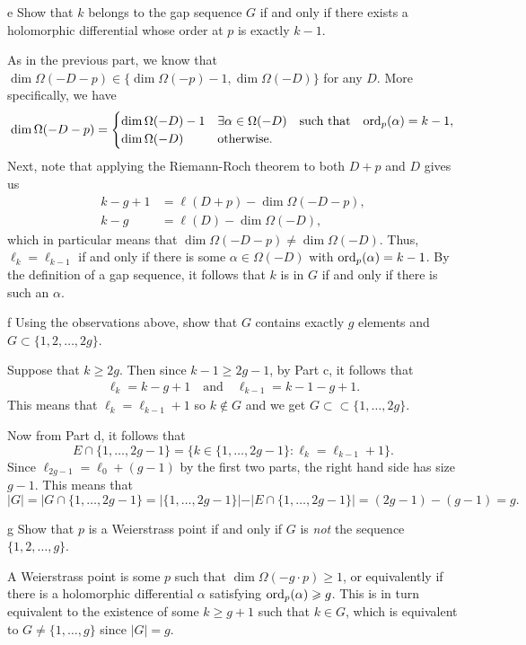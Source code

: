 \documentclass[expanded]{lkx_pset}
\begin{document}
\begin{solution}
	\begin{part}{e}
		Show that $k$ belongs to the gap sequence $G$ if and only if there
		exists a holomorphic differential whose order at $p$ is exactly $k-1$.
	\end{part}

	As in the previous part, we know that $\dim \Omega(-D-p) \in \{ \dim \Omega(-p)-1, \dim \Omega(-D)\}$ for any $D$. More specifically, we have
	\[
		\dim \Omega(-D -p) = \begin{cases}
			\dim \Omega(-D) - 1 & \exists \alpha\in \Omega(-D)\quad\textrm{such that}\quad \mathrm{ord}_p(\alpha)=k-1, \\
			\dim\Omega(-D)      & \textrm{otherwise}.
		\end{cases}
	\]
	Next, note that applying the Riemann-Roch theorem to both $D+p$ and $D$ gives us
	\[
		\begin{aligned}
			k-g+1 & = \ell(D+p) - \dim \Omega(-D - p), \\
			k-g   & = \ell(D) - \dim \Omega(-D),
		\end{aligned}
	\]
	which in particular means that $\dim \Omega(-D-p) \neq \dim\Omega(-D)$. Thus, $\ell_k=\ell_{k-1}$ if and only if there is some $\alpha \in \Omega(-D)$ with $\mathrm{ord}_p(\alpha)=k-1$. By the definition of a gap sequence, it follows that $k$ is in $G$ if and only if there is such an $\alpha$.

	\begin{part}{f}
		Using the observations above, show that $G$ contains
		exactly $g$ elements and $G\subset\{ 1, 2, \dots, 2g\}$.
	\end{part}

	Suppose that $k\geq 2g$. Then since $k-1\geq 2g-1$, by Part c, it follows that
	\[
		\begin{aligned}
			\ell_k = k-g+1\quad\textrm{and}\quad \ell_{k-1}=k-1-g+1.
		\end{aligned}
	\]
	This means that $\ell_k = \ell_{k-1}+1$ so $k\not\in G$ and we get $G\subset \subset \{1,\ldots, 2g\}$.

	Now from Part d, it follows that
	\[
		E\cap \{1,\ldots, 2g-1\} = \{k\in\{1,\ldots,2g-1\} : \ell_k = \ell_{k-1}+1\}.
	\]
	Since $\ell_{2g-1}=\ell_0 + (g-1)$ by the first two parts, the right hand side has size $g-1$. This means that \[|G| = |G\cap \{1,\ldots, 2g-1\}=|\{1,\ldots, 2g-1\}| - |E\cap \{1,\ldots, 2g-1\}| = (2g-1)-(g-1)=g.\]

	\begin{part}{g}
		Show that $p$ is a Weierstrass point if and only if $G$ is \emph{not}
		the sequence $\{1,2,\dots, g\}$.
	\end{part}

	A Weierstrass point is some $p$ such that $\dim \Omega(-g\cdot p)\geq 1$, or equivalently if there is a holomorphic differential $\alpha$ satisfying $\mathrm{ord}_p(\alpha)\geqslant g$. This is in turn equivalent to the existence of some $k\geq g+1$ such that $k\in G$, which is equivalent to $G\neq \{1,\ldots, g\}$ since $|G|=g$.
\end{solution}
\end{document}
